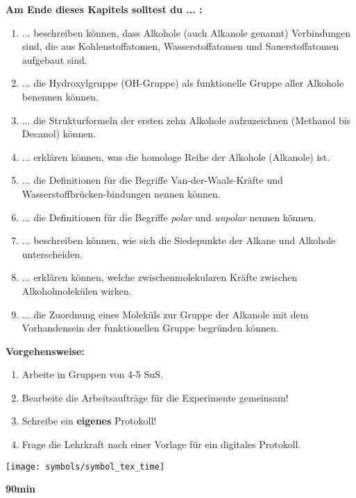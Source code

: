 \documentclass{scrartcl}  %
\begin{document}
			\begin{minipage}{0.7\textwidth}
				\noindent \textbf{Am Ende dieses Kapitels solltest du ... :}
				\begin{enumerate}
					\item ... beschreiben können, dass Alkohole (auch Alkanole genannt) Verbindungen sind, die aus Kohlenstoffatomen, Wasserstoffatomen und Sauerstoffatomen aufgebaut sind.
					\item ... die Hydroxylgruppe (OH-Gruppe) als funktionelle Gruppe aller Alkohole benennen können.
					\item ... die Strukturformeln der ersten zehn Alkohole aufzuzeichnen (Methanol bis Decanol) können. 
					\item ... erklären können, was die homologe Reihe der Alkohole (Alkanole) ist.
					\item ... die Definitionen für die Begriffe Van-der-Waals-Kräfte und Wasserstoffbrücken-bindungen nennen können.
					\item ... die Definitionen für die Begriffe \textit{polar} und \textit{unpolar} nennen können.
					\item ... beschreiben können, wie sich die Siedepunkte der Alkane und Alkohole unterscheiden.
					\item ... erklären können, welche zwischenmolekularen Kräfte zwischen Alkoholmolekülen wirken.
					\item ... die Zuordnung eines Moleküls zur Gruppe der Alkanole mit dem Vorhandensein der funktionellen Gruppe begründen können.
				\end{enumerate}	
			
				\noindent \textbf{Vorgehensweise:}
				\begin{enumerate}
					\item Arbeite in Gruppen von 4-5 SuS.
					\item Bearbeite die Arbeitsaufträge für die Experimente gemeinsam!
					\item Schreibe ein \textbf{eigenes} Protokoll!
					\item Frage die Lehrkraft nach einer Vorlage für ein digitales Protokoll.
				\end{enumerate}	
			\end{minipage}
			\hspace{0.1\textwidth}
			\begin{minipage}{0.2\textwidth}
				\begin{tcolorbox}
					[enhanced,
					width=0.9\textwidth,
					colback=white,
					colframe=black,
					fonttitle=\sffamily\bfseries\large, 
					title=Zeit,  %
					attach boxed title to top center={xshift=-0.0mm,yshift=-0.50mm},
					boxed title style={skin=enhancedfirst jigsaw,size=small,arc=1mm,bottom=-1mm,colframe=black,height=0.75cm},
					colbacktitle=black,
					drop lifted shadow]
					\centering
					\texttt{[image: symbols/symbol\_tex\_time]}
					
					\begin{center}
						\textbf{90min}
					\end{center}
				\end{tcolorbox}
			\end{minipage}
			
\end{document}
